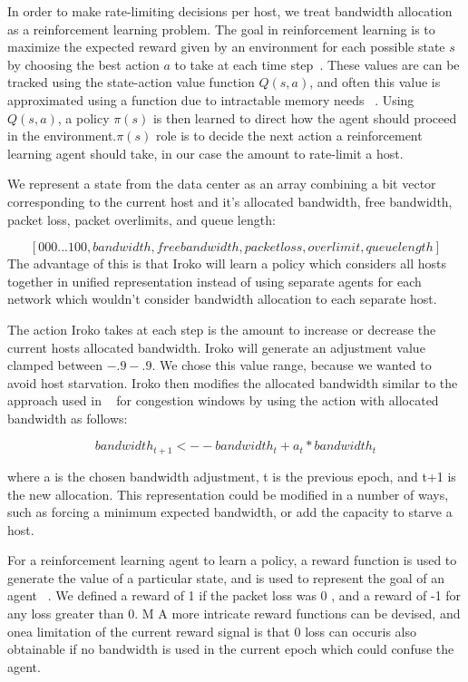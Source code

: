 In order to make rate-limiting decisions per host, we treat bandwidth allocation as a reinforcement learning problem. The goal in reinforcement learning is to maximize the expected reward given by an environment for each possible state $s$ by choosing the best action $a$ to take at each time step~\cite{Sutton:1998:IRL:551283}. These values are can be tracked using the state-action value function $Q(s,a)$, and often this value is approximated using a function due to intractable memory needs ~\cite{Sutton:1998:IRL:551283}. Using $Q(s,a)$, a policy $\pi(s)$ is then learned to direct how the agent should proceed in the environment.$\pi(s)$ role is to decide the next action a reinforcement learning agent should take, in our case the amount to rate-limit a host. 
 

We represent a state from the data center as an array combining a bit vector corresponding to the current host and it's allocated bandwidth, free bandwidth, packet loss, packet overlimits, and queue length:

\[ [0 0 0 ... 1 0 0, bandwidth, free bandwidth, packet loss, overlimit, queue length ] \]
The advantage of this is that Iroko will learn a policy which considers all hosts together in unified representation instead of using separate agents for each network which wouldn't consider bandwidth allocation to each separate host.

The action Iroko takes at each step is the amount to increase or decrease the current hosts allocated bandwidth. Iroko will generate an adjustment value clamped between $-.9 - .9$. We chose this value range, because we wanted to avoid host starvation.  Iroko then modifies the allocated bandwidth similar to the approach used in ~\cite{remy} for congestion windows by using the action with allocated bandwidth as follows:

\[bandwidth_{t+1}   <-- bandwidth_t +  a_t * bandwidth_t\]

where a is the chosen bandwidth adjustment, t is the previous epoch, and t+1 is the new allocation. This representation could be  modified in a number of ways, such as forcing a minimum expected bandwidth, or add the capacity to starve a host.
 
 
For a reinforcement learning agent to learn a policy, a reward function is used to generate the value of a particular state, and is used to represent the goal of an agent ~\cite{Sutton:1998:IRL:551283}. We defined  a reward of 1 if the packet loss was 0 , and a reward of -1 for any loss greater than 0. M  A more intricate reward functions can be devised, and onea limitation of the current reward signal is that 0 loss can occuris also obtainable if no bandwidth is used in the current epoch which could confuse the agent. 



